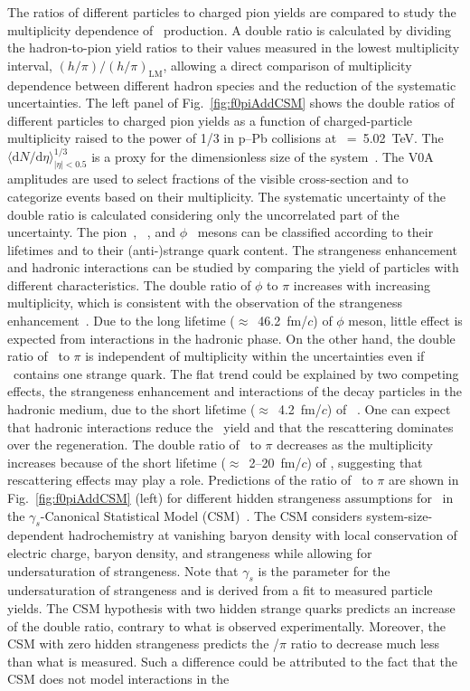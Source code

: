 The ratios of different particles to charged pion yields are compared to study the multiplicity dependence of \fzero~production. A double ratio is calculated by dividing the hadron-to-pion yield ratios to their values measured in the lowest multiplicity interval, $(h/\pi)/(h/\pi)_{\mathrm{LM}}$, allowing a direct comparison of multiplicity dependence between different hadron species and the reduction of the systematic uncertainties. The left panel of Fig.~\ref{fig:f0piAddCSM} shows the double ratios of different particles to charged pion yields as a function of charged-particle multiplicity raised to the power of 1/3 in p--Pb collisions at \snn~=~5.02~TeV. The $\langle \mathrm{d}N/\mathrm{d}\eta \rangle_{|\eta|<0.5}^{1/3}$ is a proxy for the dimensionless size of the system~\cite{Liu:2018xae}. The V0A amplitudes are used to select fractions of the visible cross-section and to categorize events based on their multiplicity. The systematic uncertainty of the double ratio is calculated considering only the uncorrelated part of the uncertainty. The pion~\cite{ALICE:2016dei}, \kstar~\cite{ALICE:2016sak}, and $\phi$~\cite{ALICE:2016sak} mesons can be classified according to their lifetimes and to their (anti-)strange quark content. The strangeness enhancement and hadronic interactions can be studied by comparing the yield of particles with different characteristics. The double ratio of $\phi$ to $\pi$ increases with increasing multiplicity, which is consistent with the observation of the strangeness enhancement~\cite{ALICE:2016fzo}. Due to the long lifetime ($\approx$~46.2~fm/$c$) of $\phi$ meson, little effect is expected from interactions in the hadronic phase. On the other hand, the double ratio of \kstar~to $\pi$ is independent of multiplicity within the uncertainties even if \kstar~contains one strange quark. The flat trend could be explained by two competing effects, the strangeness enhancement and interactions of the decay particles in the hadronic medium, due to the short lifetime ($\approx$~4.2~fm/$c$) of \kstar~\cite{ParticleDataGroup:2022pth}. One can expect that hadronic interactions reduce the \kstar~yield and that the rescattering dominates over the regeneration. The double ratio of \fzero~to $\pi$ decreases as the multiplicity increases because of the short lifetime ($\approx$~2--20~fm/$c$) of \fzero, suggesting that rescattering effects may play a role. Predictions of the ratio of \fzero~to $\pi$ are shown in Fig.~\ref{fig:f0piAddCSM} (left) for different hidden strangeness assumptions for \fzero~in the $\gamma_{s}$-Canonical Statistical Model (CSM)~\cite{Vovchenko:2019kes}. The CSM considers system-size-dependent hadrochemistry at vanishing baryon density with local conservation of electric charge, baryon density, and strangeness while allowing for undersaturation of strangeness. Note that $\gamma_{s}$ is the parameter for the undersaturation of strangeness and is derived from a fit to measured particle yields. The CSM hypothesis with two hidden strange quarks predicts an increase of the double ratio, contrary to what is observed experimentally. Moreover, the CSM with zero hidden strangeness predicts the \fzero/$\pi$ ratio to decrease much less than what is measured. Such a difference could be attributed to the fact that the CSM does not model interactions in the 